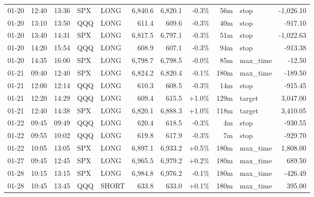 \documentclass[11pt,a4paper,twoside]{article}
\begin{document}
\begin{center}
\begin{longtable}{>{\color{txtmain}}l l l l l r r r r >{\color{txtmain}}l r}
01-20 & 12:40 & 13:36 & SPX & LONG & 6,840.6 & 6,820.1 & \textcolor{lossred}{-0.3\%} & 56m & stop & \textcolor{lossred}{-1,026.10} \\
01-20 & 13:10 & 13:50 & QQQ & LONG & 611.4 & 609.6 & \textcolor{lossred}{-0.3\%} & 40m & stop & \textcolor{lossred}{-917.10} \\
01-20 & 13:40 & 14:31 & SPX & LONG & 6,817.5 & 6,797.1 & \textcolor{lossred}{-0.3\%} & 51m & stop & \textcolor{lossred}{-1,022.63} \\
01-20 & 14:20 & 15:54 & QQQ & LONG & 608.9 & 607.1 & \textcolor{lossred}{-0.3\%} & 94m & stop & \textcolor{lossred}{-913.38} \\
01-20 & 14:35 & 16:00 & SPX & LONG & 6,798.7 & 6,798.5 & \textcolor{lossred}{-0.0\%} & 85m & max\_time & \textcolor{lossred}{-12.50} \\
01-21 & 09:40 & 12:40 & SPX & LONG & 6,824.2 & 6,820.4 & \textcolor{lossred}{-0.1\%} & 180m & max\_time & \textcolor{lossred}{-189.50} \\
01-21 & 12:00 & 12:14 & QQQ & LONG & 610.3 & 608.5 & \textcolor{lossred}{-0.3\%} & 14m & stop & \textcolor{lossred}{-915.45} \\
01-21 & 12:20 & 14:29 & QQQ & LONG & 609.4 & 615.5 & \textcolor{wingreen}{+1.0\%} & 129m & target & \textcolor{wingreen}{3,047.00} \\
01-21 & 12:40 & 14:38 & SPX & LONG & 6,820.1 & 6,888.3 & \textcolor{wingreen}{+1.0\%} & 118m & target & \textcolor{wingreen}{3,410.05} \\
01-22 & 09:45 & 09:49 & QQQ & LONG & 620.4 & 618.5 & \textcolor{lossred}{-0.3\%} & 4m & stop & \textcolor{lossred}{-930.55} \\
01-22 & 09:55 & 10:02 & QQQ & LONG & 619.8 & 617.9 & \textcolor{lossred}{-0.3\%} & 7m & stop & \textcolor{lossred}{-929.70} \\
01-22 & 10:05 & 13:05 & SPX & LONG & 6,897.1 & 6,933.2 & \textcolor{wingreen}{+0.5\%} & 180m & max\_time & \textcolor{wingreen}{1,808.00} \\
01-27 & 09:45 & 12:45 & SPX & LONG & 6,965.5 & 6,979.2 & \textcolor{wingreen}{+0.2\%} & 180m & max\_time & \textcolor{wingreen}{689.50} \\
01-28 & 10:15 & 13:15 & SPX & LONG & 6,984.8 & 6,976.2 & \textcolor{lossred}{-0.1\%} & 180m & max\_time & \textcolor{lossred}{-426.49} \\
01-28 & 10:45 & 13:45 & QQQ & SHORT & 633.8 & 633.0 & \textcolor{wingreen}{+0.1\%} & 180m & max\_time & \textcolor{wingreen}{395.00} \\

\end{longtable}
\end{center}
\end{document}
